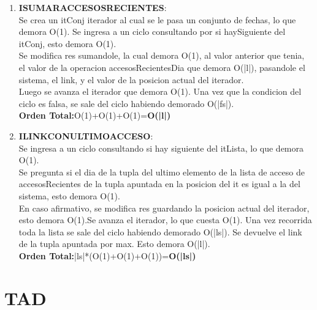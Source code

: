 \documentclass[10pt, a4paper]{article}
\begin{document}
\begin{enumerate}
     \item \textbf{ISUMARACCESOSRECIENTES}:\\ Se crea un itConj iterador al cual se le pasa un conjunto de fechas, lo que demora O(1). Se ingresa a un ciclo consultando por si haySiguiente del itConj, esto demora O(1).\\
Se modifica res sumandole, la cual demora O(1), al valor anterior que tenia, el valor de la operacion accesosRecientesDia que demora O(|l|), pasandole el sistema, el link, y el valor de la posicion actual del iterador.\\ 
Luego se avanza el iterador que demora O(1). Una vez que la condicion del ciclo es falsa, se sale del ciclo habiendo demorado O(|fs|). \\
\textbf{Orden Total:}O(1)+O(1)+O(1)=\textbf{O(|l|)}

     \item \textbf{ILINKCONULTIMOACCESO}:\\ Se ingresa a un ciclo consultando si hay siguiente del itLista, lo que demora O(1). \\
 Se pregunta si el dia de la tupla del ultimo elemento de la lista de acceso de accesosRecientes de la tupla apuntada en la posicion del it es igual a la del sistema, esto demora O(1). \\
En caso afirmativo, se modifica res guardando la posicion actual del iterador, esto demora O(1).Se avanza el iterador, lo que cuesta O(1). Una vez recorrida toda la lista se sale del ciclo habiendo demorado O(|ls|). Se devuelve el link de la tupla apuntada por max. Esto demora O(|l|). \\
\textbf{Orden Total:}|ls|*(O(1)+O(1)+O(1))=\textbf{O(|ls|)}
      

    \end{enumerate}




\section{TAD }
\end{document}
